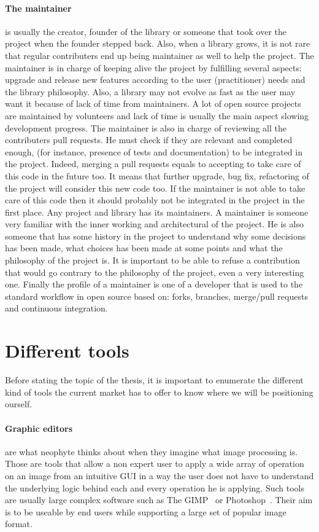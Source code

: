 \paragraph{The maintainer} is usually the creator, founder of the library or someone that took over the project when the
founder stepped back. Also, when a library grows, it is not rare that regular contributers end up being maintainer as
well to help the project. The maintainer is in charge of keeping alive the project by fulfilling several aspects:
upgrade and release new features according to the user (practitioner) needs and the library philosophy. Also, a library
may not evolve as fast as the user may want it because of lack of time from maintainers. A lot of open source projects
are maintained by volunteers and lack of time is usually the main aspect slowing development progress. The maintainer is
also in charge of reviewing all the contributers pull requests. He must check if they are relevant and completed enough,
(for instance, presence of tests and documentation) to be integrated in the project. Indeed, merging a pull requests
equals to accepting to take care of this code in the future too. It means that further upgrade, bug fix, refactoring of
the project will consider this new code too. If the maintainer is not able to take care of this code then it should
probably not be integrated in the project in the first place. Any project and library has its maintainers. A maintainer
is someone very familiar with the inner working and architectural of the project. He is also someone that has some
history in the project to understand why some decisions has been made, what choices has been made at some points and
what the philosophy of the project is. It is important to be able to refuse a contribution that would go contrary to the
philosophy of the project, even a very interesting one. Finally the profile of a maintainer is one of a developer that
is used to the standard workflow in open source based on: forks, branches, merge/pull requests and continuous
integration.

\section*{Different tools}

Before stating the topic of the thesis, it is important to enumerate the different kind of tools the current market has
to offer to know where we will be positioning ourself.

\paragraph{Graphic editors} are what neophyte thinks about when they imagine what image processing is. Those are tools
that allow a non expert user to apply a wide array of operation on an image from an intuitive GUI in a way the user does
not have to understand the underlying logic behind each and every operation he is applying. Such tools are usually large
complex software such as The GIMP~\parencite{gimp.2019} or Photoshop~\parencite{adobe.2019.photoshop}. Their aim is to
be useable by end users while supporting a large set of popular image format.

